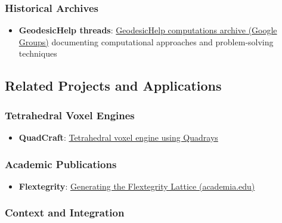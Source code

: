 \documentclass[
  10pt,
]{article}
\providecommand{\tightlist}{%
  \setlength{\itemsep}{0pt}\setlength{\parskip}{0pt}}
\begin{document}
\hypertarget{historical-archives}{%
\subsubsection{Historical Archives}\label{historical-archives}}

\begin{itemize}
\tightlist
\item
  \textbf{GeodesicHelp threads}:
  \href{https://groups.google.com/g/GeodesicHelp/}{GeodesicHelp
  computations archive (Google Groups)} documenting computational
  approaches and problem-solving techniques
\end{itemize}

\hypertarget{related-projects-and-applications}{%
\subsection{Related Projects and
Applications}\label{related-projects-and-applications}}

\hypertarget{tetrahedral-voxel-engines}{%
\subsubsection{Tetrahedral Voxel
Engines}\label{tetrahedral-voxel-engines}}

\begin{itemize}
\tightlist
\item
  \textbf{QuadCraft}:
  \href{https://github.com/docxology/quadcraft/}{Tetrahedral voxel
  engine using Quadrays}
\end{itemize}

\hypertarget{academic-publications}{%
\subsubsection{Academic Publications}\label{academic-publications}}

\begin{itemize}
\tightlist
\item
  \textbf{Flextegrity}:
  \href{https://www.academia.edu/44531954/Generating_the_Flextegrity_Lattice}{Generating
  the Flextegrity Lattice (academia.edu)}
\end{itemize}

\hypertarget{context-and-integration}{%
\subsubsection{Context and Integration}\label{context-and-integration}}
\end{document}
